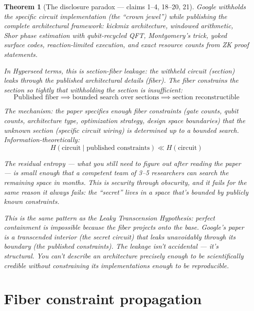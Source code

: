 \documentclass[11pt,a4paper]{article}
\newtheorem{theorem}[definition]{Theorem}
\begin{document}
\begin{theorem}[The disclosure paradox --- claims 1--4, 18--20, 21]
\label{thm:leakage}
Google withholds the specific circuit implementation (the ``crown jewel'')
while publishing the complete architectural framework: kickmix architecture,
windowed arithmetic, Shor phase estimation with qubit-recycled QFT,
Montgomery's trick, yoked surface codes, reaction-limited execution,
and exact resource counts from ZK proof statements.

In Hyperseed terms, this is \emph{section-fiber leakage}: the withheld
circuit (section) leaks through the published architectural details
(fiber). The fiber constrains the section so tightly that withholding
the section is insufficient:
\[
  \text{Published fiber} \implies \text{bounded search over sections}
  \implies \text{section reconstructible}
\]

The mechanism: the paper specifies enough fiber constraints (gate counts,
qubit counts, architecture type, optimization strategy, design space
boundaries) that the unknown section (specific circuit wiring) is
determined up to a bounded search. Information-theoretically:
\[
  H(\text{circuit} \mid \text{published constraints})
  \ll H(\text{circuit})
\]

The residual entropy --- what you still need to figure out after reading
the paper --- is small enough that a competent team of 3--5 researchers
can search the remaining space in months. This is security through
obscurity, and it fails for the same reason it always fails: the
``secret'' lives in a space that's bounded by publicly known constraints.

This is the same pattern as the Leaky Transcension Hypothesis: perfect
containment is impossible because the fiber projects onto the base.
Google's paper is a transcended interior (the secret circuit) that leaks
unavoidably through its boundary (the published constraints). The leakage
isn't accidental --- it's structural. You can't describe an architecture
precisely enough to be scientifically credible without constraining its
implementations enough to be reproducible.
\end{theorem}

\section{Fiber constraint propagation}
\label{sec:propagation}
\end{document}
